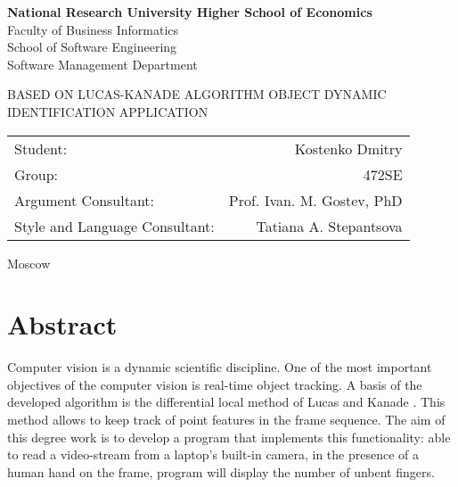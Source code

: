\documentclass[12pt,a4paper,oneside,titlepage]{article}
\author{Kostenko}
\begin{document}
{
\thispagestyle{empty}
\newpage
\centering

\textbf{
National Research University Higher School of Economics\\
}
Faculty of Business Informatics\\
School of Software Engineering\\
Software Management Department

\vfill


\begin{large}
\MakeTextUppercase{
Based on Lucas-Kanade algorithm Object dynamic identification application
}
\end{large}


\vfill

\begin{tabular}{lr}
Student: & Kostenko Dmitry \\
Group: & 472SE \\
Argument Consultant: & Prof. Ivan. M. Gostev, PhD \\
Style and Language Consultant: & Tatiana A. Stepantsova
\end{tabular}

\vspace{\fill}

Moscow\\ \number\year
\clearpage
}


\section*{Abstract}
{
Computer vision is a dynamic scientific discipline.
One of the most important objectives of the computer vision is real-time object tracking.
A basis of the developed algorithm is the differential local method of Lucas and Kanade \cite{lucasKanade}.
This method allows to keep track of point features in the frame sequence. 
The aim of this degree work is to develop a program that implements this functionality:
able to read a video-stream from a laptop's built-in camera,
in the presence of a human hand on the frame, program will display the number of unbent fingers.
}
\end{document}
